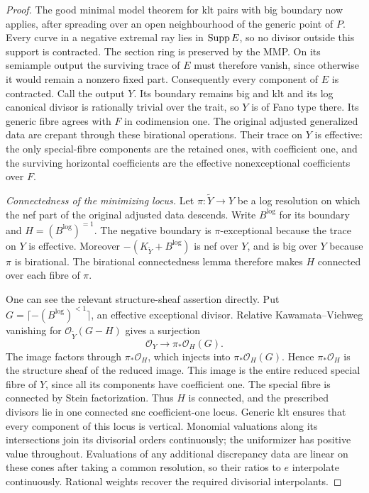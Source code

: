 \begin{proof}
The good minimal model theorem for klt pairs with big boundary now
applies, after spreading over an open neighbourhood of the generic
point of $P$.  Every curve in a negative extremal ray lies in $\operatorname{Supp} E$, so
no divisor outside this support is contracted.  The section ring is
preserved by the MMP.  On its semiample output the surviving trace of
$E$ must therefore vanish, since otherwise it would remain a nonzero
fixed part.  Consequently every component of $E$ is contracted.
Call the output $Y$.  Its boundary remains big and klt and its log
canonical divisor is rationally trivial over the trait, so $Y$ is of
Fano type there.  Its generic fibre agrees with $F$ in codimension one.
The original adjusted generalized data are crepant through these
birational operations.  Their trace on $Y$ is effective: the only
special-fibre components are the retained ones, with coefficient one,
and the surviving horizontal coefficients are the effective
nonexceptional coefficients over $F$.

\emph{Connectedness of the minimizing locus.}
Let $\pi:\widetilde Y\to Y$ be a log resolution on which the nef part
of the original adjusted data descends.  Write $B^{\log}$ for its
boundary and $H=(B^{\log})^{=1}$.  The negative boundary is
$\pi$-exceptional because the trace on $Y$ is effective.  Moreover
$-(K_{\widetilde Y}+B^{\log})$ is nef over $Y$, and is big over $Y$
because $\pi$ is birational.  The birational connectedness lemma
therefore makes $H$ connected over each fibre of $\pi$.

One can see the relevant structure-sheaf assertion directly.  Put
$G=\lceil-(B^{\log})^{<1}\rceil$, an effective exceptional divisor.
Relative Kawamata--Viehweg vanishing for
$\mathcal O_{\widetilde Y}(G-H)$ gives a surjection
\[
               \mathcal O_Y\longrightarrow\pi_*\mathcal O_H(G).
\]
The image factors through $\pi_*\mathcal O_H$, which injects into
$\pi_*\mathcal O_H(G)$.  Hence $\pi_*\mathcal O_H$ is the structure
sheaf of the reduced image.  This image is the entire reduced special
fibre of $Y$, since all its components have coefficient one.  The
special fibre is connected by Stein factorization.  Thus $H$ is
connected, and the prescribed divisors lie in one connected snc
coefficient-one locus.  Generic klt ensures that every component of
this locus is vertical.  Monomial valuations along its intersections
join its divisorial orders continuously; the uniformizer has positive
value throughout.  Evaluations of any additional discrepancy data are
linear on these cones after taking a common resolution, so their
ratios to $e$ interpolate continuously.  Rational weights recover the
required divisorial interpolants.


\end{proof}
